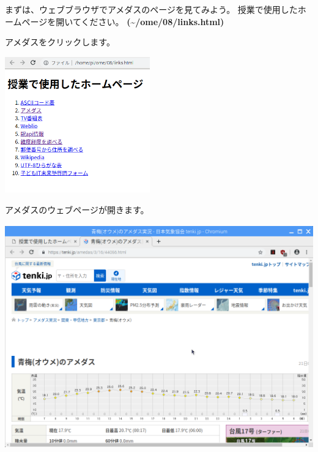 \documentclass[a4paper,12pt,dvipdfmx]{jarticle}
\begin{document}
\bigskip

まずは、ウェブブラウザでアメダスのページを見てみよう。
授業で使用したホームページを開いてください。
\textbf{(\~{}/ome/08/links.html)}

アメダスをクリックします。 



\begin{center}
\includegraphics[width=6.271cm,height=5.86cm]{textbook-img017.png}

\end{center}

\bigskip


\bigskip



アメダスのウェブページが開きます。

\begin{center}
\includegraphics[width=14.252cm,height=9.687cm]{textbook-img028.png}

\end{center}
\end{document}

